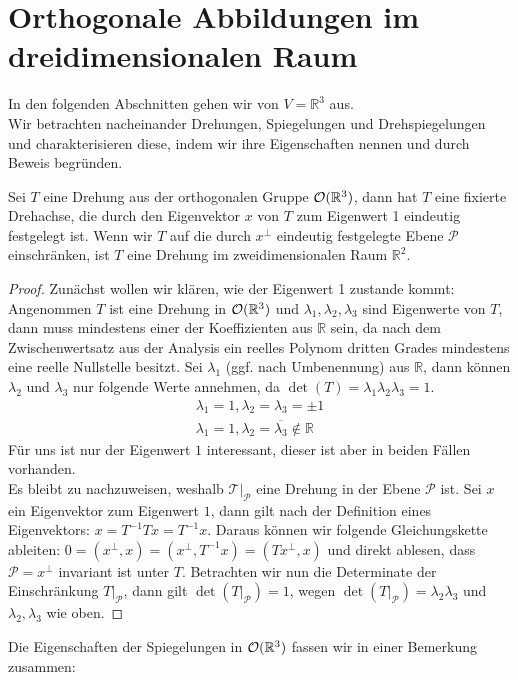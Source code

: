 \section{Orthogonale Abbildungen im dreidimensionalen Raum}
In den folgenden Abschnitten gehen wir von $V= \mathbb{R}^3$ aus.\\
Wir betrachten nacheinander Drehungen, Spiegelungen und Drehspiegelungen und charakterisieren diese, indem wir ihre Eigenschaften nennen und durch Beweis begründen. 
\begin{theorem}
Sei $T$ eine Drehung aus der orthogonalen Gruppe ${\mathcal{O}(\mathbb{R}^3)}$, dann hat $T$ eine fixierte Drehachse, die durch den Eigenvektor $x$ von $T$ zum Eigenwert 1 eindeutig festgelegt ist. 
Wenn wir $T$ auf die durch $x^{\perp}$ eindeutig festgelegte Ebene $\mathcal{P}$ einschränken, ist $T$ eine Drehung im zweidimensionalen Raum $\mathbb{R}^2$. 
\end{theorem}
\begin{proof}
Zunächst wollen wir klären, wie der Eigenwert 1 zustande kommt:
 Angenommen $T$ ist eine Drehung in ${\mathcal{O}(\mathbb{R}^3)}$ und $\lambda_1,\lambda_2,\lambda_3$ sind Eigenwerte von $T$, dann muss mindestens einer der Koeffizienten aus $\mathbb{R}$ sein, da nach dem Zwischenwertsatz aus der Analysis ein reelles Polynom dritten Grades mindestens eine reelle Nullstelle besitzt. Sei $\lambda_1$ (ggf. nach Umbenennung) aus $\mathbb{R}$, dann können $\lambda_2$ und $\lambda_3$ nur folgende Werte annehmen, da $\det(T)=\lambda_1\lambda_2\lambda_3=1$.
 \begin{align}
  \lambda_1=1, \lambda_2=\lambda_3=\pm1 \\
  \lambda_1=1, \lambda_2=\overline{\lambda_3}\notin \mathbb{R}
 \end{align}
Für uns ist nur der Eigenwert $1$ interessant, dieser ist aber in beiden Fällen vorhanden.\\
Es bleibt zu nachzuweisen, weshalb $\mathcal{T}|_\mathcal{P}$ eine Drehung in der Ebene $\mathcal{P}$ ist.
Sei $x$ ein Eigenvektor zum Eigenwert $1$, dann gilt nach der Definition eines Eigenvektors: $x=T^{-1}Tx=T^{-1}x$. Daraus können wir folgende Gleichungskette ableiten: $0=(x^{\perp},x)=(x^{\perp},T^{-1}x)=(Tx^{\perp},x)$ und direkt ablesen, dass $\mathcal{P}=x^{\perp}$ invariant ist unter $T$. Betrachten wir nun die Determinate der Einschränkung $T|_\mathcal{P}$, dann gilt $\det(T|_\mathcal{P})=1$, wegen $\det(T|_\mathcal{P}) = \lambda_2\lambda_3$ und $\lambda_2,\lambda_3$ wie oben.
\end{proof}
Die Eigenschaften der Spiegelungen in ${\mathcal{O}(\mathbb{R}^3)}$ fassen wir in einer Bemerkung zusammen:
